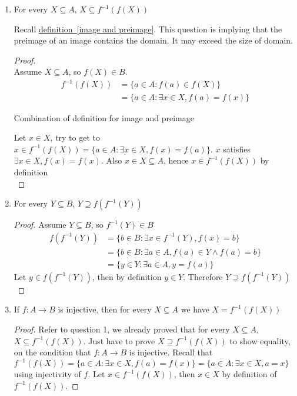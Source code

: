 \documentclass[11pt]{article}
\begin{document}
\begin{enumerate}
  \item For every $X\subseteq A$, $X \subseteq f^{-1}(f(X))$ \\
    \begin{rem}
      Recall \hyperref[image and preimage]{definition~\eqref{image and preimage}}. This question is implying that the preimage of an image contains the domain. It may exceed the size of domain.
    \end{rem}
    \begin{proof}
      $ $\\
      Assume $X \subseteq A$, so $f(X) \in B$.
      \[
        \begin{split}
          f^{-1}(f(X)) &= \{a \in A: f(a) \in f(X)\} \\
          &= \{ a\in A: \exists x\in X, f(a) = f(x)\}
        \end{split}
      \]
      \begin{note}
        Combination of definition for image and preimage
      \end{note}
      Let $x\in X$, try to get to $x\in f^{-1}(f(X)) = \{ a\in A: \exists x\in X, f(x) = f(a)\}$. $x$ satisfies $\exists x\in X, f(x) = f(x)$. Also $x\in X\subseteq A$, hence $x\in f^{-1}(f(X))$ by definition\\
    \end{proof}
  \item For every $Y\subseteq B$, $Y \supseteq f(f^{-1}(Y))$ \\
    \begin{proof}
    Assume $Y \subseteq B$, so $f^{-1}(Y) \in B$
    \[
      \begin{split}
        f(f^{-1}(Y)) &= \{ b\in B: \exists x\in f^{-1}(Y), f(x) = b \} \\
        &= \{ b\in B: \exists a\in A, f(a) \in Y \land f(a) = b\} \\
        &= \{ y\in Y: \exists a\in A, y = f(a)\}
      \end{split}
    \]
    Let $y\in f(f^{-1}(Y))$, then by definition $y\in Y$. Therefore $Y \supseteq f(f^{-1}(Y))$
    \end{proof}
  \item If $f: A\to B$ is injective, then for every $X\subseteq A$ we have $X = f^{-1}(f(X))$
  \begin{proof}
    Refer to question 1, we already proved that for every $X\subseteq A$, $X \subseteq f^{-1}(f(X))$. Just have to prove $X \supseteq f^{-1}(f(X))$ to show equality, on the condition that $f: A \to B$ is injective. Recall that $f^{-1}(f(X)) = \{ a\in A: \exists x\in X, f(a) = f(x)\} = \{ a\in A: \exists x\in X, a=x\}$ using injectivity of $f$. Let $x\in f^{-1}(f(X))$, then $x\in X$ by definition of $f^{-1}(f(X))$.
  \end{proof}


\end{enumerate}
\end{document}
